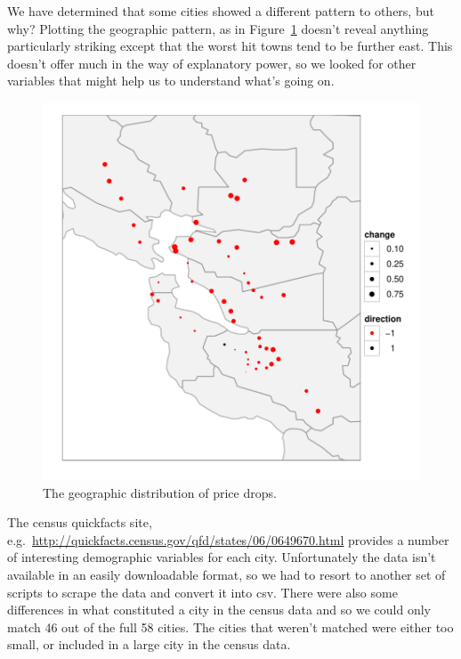 \documentclass[oneside]{article}
\begin{document}
We have determined that some cities showed a different pattern to others, but why? Plotting the geographic pattern, as in Figure~\ref{fig:geo} doesn't reveal anything particularly striking except that the worst hit towns tend to be further east. This doesn't offer much in the way of explanatory power, so we looked for other variables that might help us to understand what's going on. 

\begin{figure}[htbp]
  \centering
    \includegraphics[width=0.4\linewidth]{cities-geo-changes}
  \caption{The geographic distribution of price drops.}
  \label{fig:geo}
\end{figure}

The census quickfacts site, e.g.\ \url{http://quickfacts.census.gov/qfd/states/06/0649670.html} provides a number of interesting demographic variables for each city.  Unfortunately the data isn't available in an easily downloadable format, so we had to resort to another set of scripts to scrape the data and convert it into csv.  There were also some differences in what constituted a city in the census data and so we could only match 46 out of the full 58 cities.  The cities that weren't matched were either too small, or included in a large city in the census data.
\end{document}
